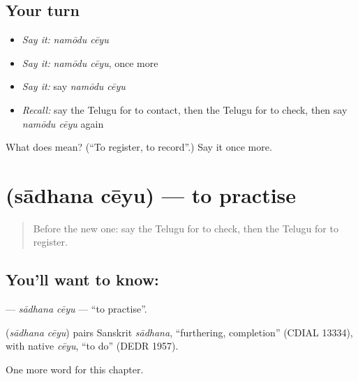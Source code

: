 \subsection*{Your turn}
\begin{itemize}
\raggedright
  \item \emph{Say it:} \emph{namōdu cēyu}
  \item \emph{Say it:} \emph{namōdu cēyu}, once more
  \item \emph{Say it:} say \emph{namōdu cēyu}
  \item \emph{Recall:} say the Telugu for to contact, then the Telugu for to check, then say \emph{namōdu cēyu} again
\end{itemize}

\begin{tcolorbox}[breakable,colback=teal!4,colframe=teal!35!black,title={Before you move on}]
What does   mean? (\textquotedblleft{}To register, to record\textquotedblright{}.) Say it once more.
\end{tcolorbox}
\section[\texorpdfstring{\te{సాధన} \te{చేయు} (sādhana cēyu)}{సాధన చేయు (sādhana cēyu)}]{  (sādhana cēyu) — to practise}

\label{lesson:TE-C202-sadhana-ceyu}



\begin{quote}
Before the new one: say the Telugu for to check, then the Telugu for to register.
\end{quote}

\subsection*{You'll want to know:  }
\textbf{ } — \emph{sādhana cēyu} — \textquotedblleft{}to practise\textquotedblright{}.

\begin{cousinweb}
\textbf{ } (\emph{sādhana cēyu}) pairs Sanskrit \emph{sādhana}, \textquotedblleft{}furthering, completion\textquotedblright{} (CDIAL 13334), with native \emph{cēyu}, \textquotedblleft{}to do\textquotedblright{} (DEDR 1957).
\end{cousinweb}

\begin{grammarlens}[title={What you've built}]
One more word for this chapter.
\end{grammarlens}

